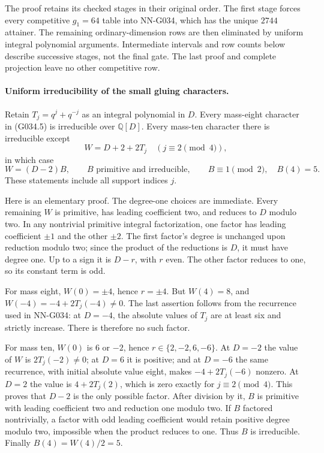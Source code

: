 The proof retains its checked stages in their original order.
The first stage forces every competitive $g_1=64$ table into
NN-G034, which has the unique $2744$ attainer. The remaining
ordinary-dimension rows are then eliminated by uniform
integral polynomial arguments. Intermediate intervals and
row counts below describe successive stages, not the final
gate. The last proof and complete projection leave no other
competitive row.

\paragraph{Uniform irreducibility of the small gluing characters.}
Retain $T_j=q^j+q^{-j}$ as an integral polynomial in $D$.
Every mass-eight character in (G034.5) is irreducible
over $\mathbb Q[D]$.
Every mass-ten character there is irreducible except
\[
 W=D+2+2T_j\quad(j\equiv2\pmod4),
\]
in which case
\[
               W=(D-2)B,\qquad B\text{ primitive and irreducible},
               \qquad B\equiv1\pmod2,\quad B(4)=5.   \tag{G036.2}
\]
These statements include all support indices $j$.

Here is an elementary proof. The degree-one choices
are immediate. Every remaining $W$ is primitive,
has leading coefficient two, and reduces to $D$
modulo two. In any nontrivial primitive integral
factorization, one factor has leading coefficient
$\pm1$ and the other $\pm2$. The first factor's
degree is unchanged upon reduction modulo two;
since the product of the reductions is $D$, it
must have degree one. Up to a sign it is $D-r$,
with $r$ even. The other factor reduces to one,
so its constant term is odd.

For mass eight, $W(0)=\pm4$, hence $r=\pm4$.
But $W(4)=8$, and $W(-4)=-4+2T_j(-4)\ne0$.
The last assertion follows from the recurrence
used in NN-G034: at $D=-4$, the absolute values
of $T_j$ are at least six and strictly increase.
There is therefore no such factor.

For mass ten, $W(0)$ is $6$ or $-2$, hence
$r\in\{2,-2,6,-6\}$.
At $D=-2$ the value of $W$ is $2T_j(-2)\ne0$;
at $D=6$ it is positive; and at $D=-6$ the
same recurrence, with initial absolute value eight,
makes $-4+2T_j(-6)$ nonzero.
At $D=2$ the value is $4+2T_j(2)$, which is
zero exactly for $j\equiv2\pmod4$.
This proves that $D-2$ is the only possible factor.
After division by it, $B$ is primitive with leading
coefficient two and reduction one modulo two.
If $B$ factored nontrivially, a factor with odd
leading coefficient would retain positive degree
modulo two, impossible when the product reduces
to one. Thus $B$ is irreducible.
Finally $B(4)=W(4)/2=5$.

